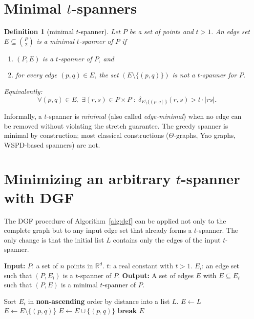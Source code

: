 \documentclass{cccg26}
\newtheorem{definition}[theorem]{Definition}
\begin{document}
\section{Minimal \texorpdfstring{$t$}{t}-spanners}
\label{sec:minimal-def}

\begin{definition}[minimal $t$-spanner]\label{def:minimal}
Let $P$ be a set of points and $t>1$. An edge set $E\subseteq \binom{P}{2}$
is a \emph{minimal $t$-spanner} of $P$ if
\begin{enumerate}
    \item $(P,E)$ is a $t$-spanner of $P$, and
    \item for every edge $(p,q)\in E$, the set $(E \setminus \{(p,q)\})$ is not a $t$-spanner for $P$.
\end{enumerate}
Equivalently:
\[
   \forall (p,q)\in E,\; \exists (r,s)\in P\times P\;:\;
   \delta_{E\setminus\{(p,q)\}}(r,s) > t\cdot|rs|.
\]
\end{definition}

Informally, a $t$-spanner is \emph{minimal} (also called \emph{edge-minimal})
when no edge can be removed without violating the stretch guarantee. The
greedy spanner is minimal by construction; most classical constructions
($\Theta$-graphs, Yao graphs, WSPD-based spanners) are not.

\section{Minimizing an arbitrary \texorpdfstring{$t$}{t}-spanner with DGF}
\label{sec:filtering}

The DGF procedure of Algorithm~\ref{alg:dgf} can be applied not only to
the complete graph but to any input edge set that already forms a
$t$-spanner. The only change is that the initial list $L$ contains
only the edges of the input $t$-spanner.

\begin{algorithm*}[h]
\caption{Descending Greedy Filter on a $t$-spanner}
\label{alg:dgf-filter}
\begin{algorithmic}[1]
\Statex \textbf{Input:}
\Statex \hspace{1cm} $P$: a set of $n$ points in $\mathbb{R}^d$.
\Statex \hspace{1cm} $t$: a real constant with $t>1$.
\Statex \hspace{1cm} $E_i$: an edge set such that $(P,E_i)$ is a $t$-spanner of $P$.
\Statex \textbf{Output:}
\Statex \hspace{1cm} A set of edges $E$ with $E\subseteq E_i$ such that $(P,E)$ is a minimal $t$-spanner of $P$.

\State Sort $E_i$ in \textbf{non-ascending} order by distance into a list $L$.
\State $E \leftarrow L$
    \State $E \leftarrow E \setminus \{(p,q)\}$
            \State $E \leftarrow E \cup \{(p,q)\}$
            \State \textbf{break}
        \EndIf
    \EndFor
\EndFor
\State \Return $E$
\end{algorithmic}
\end{algorithm*}
\end{document}
